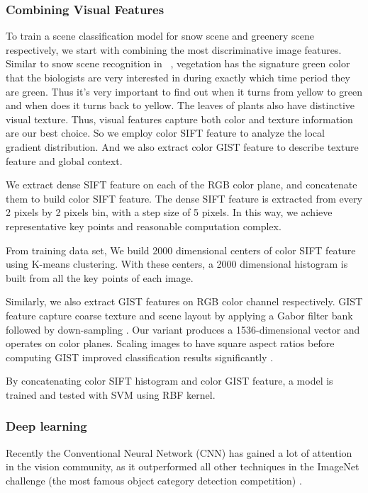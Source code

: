 \subsubsection{Combining Visual Features}
To train a scene classification model for snow scene and greenery scene respectively, we start with 
combining the most discriminative image features. Similar to snow scene recognition in 
~\cite{wang2013observing}, 
vegetation has the signature green color that the  
biologists are very interested in during exactly which time period they are green. 
Thus it's very important 
to find out when it turns from yellow to green and when does it turns back to yellow.
The leaves of plants also have distinctive visual texture. 
Thus, visual features capture both color and texture information are our best choice.
So we employ color SIFT feature  to analyze the local gradient distribution. 
And we also extract color GIST feature to describe texture feature and global context. 

We extract dense SIFT feature on each of the RGB color plane, and concatenate them to 
build color SIFT feature. The dense SIFT feature is extracted from every 2 pixels by 2 pixels bin, 
with a step size of 5 pixels. In this way, we achieve representative key points and reasonable 
computation complex. 

From training data set, We build 2000 dimensional centers of color SIFT feature 
using K-means clustering. With these centers, a 2000 dimensional histogram is built 
from all the key points of each image.

 Similarly, we also extract GIST features on RGB color channel respectively.
GIST feature capture coarse texture
and scene layout by applying a Gabor filter bank followed by
down-sampling . Our variant produces a
1536-dimensional vector and operates on color planes. Scaling
images to have square aspect ratios before computing GIST improved
classification results significantly .

By concatenating color SIFT histogram and color GIST feature, 
a model is trained and tested with SVM using RBF kernel.

\subsubsection{Deep learning}
Recently the Conventional Neural Network (CNN) 
has gained a lot of attention 
in the vision community, as it outperformed all other techniques in the ImageNet challenge 
(the most famous object category detection competition) .

